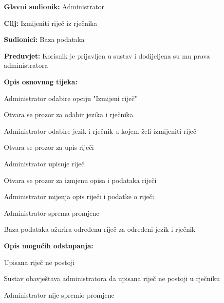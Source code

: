 					\noindent {}
					\begin{packed_item}
	
						\item \textbf{Glavni sudionik: }Administrator
						\item  \textbf{Cilj:} Izmijeniti riječ iz rječnika
						\item  \textbf{Sudionici:} Baza podataka
						\item  \textbf{Preduvjet:} Korisnik je prijavljen u sustav i dodijeljena su mu prava administratora
						\item  \textbf{Opis osnovnog tijeka:}
						
						\item[] \begin{packed_enum}
	
							\item Administrator odabire opciju "Izmijeni riječ"
							\item Otvara se prozor za odabir jezika i rječnika
							\item Administrator odabire jezik i rječnik u kojem želi izmijeniti riječ
							\item Otvara se prozor za upis riječi
							\item Administrator upisuje riječ
							\item Otvara se prozor za izmjenu opisa i podataka riječi
							\item Administrator mijenja opis riječi i podatke o riječi
							\item Administrator sprema promjene
							\item Baza podataka ažurira određenu riječ za određeni jezik i rječnik
						\end{packed_enum}

						\item  \textbf{Opis mogućih odstupanja:}
						
						\item[] \begin{packed_item}
	
							\item[5.a] Upisana riječ ne postoji
							\item[] \begin{packed_enum}
								
								\item Sustav obavještava administratora da upisana riječ ne postoji u rječniku
								
							\end{packed_enum}
							\item[8.a] Administrator nije spremio promjene
							\item[] \begin{packed_enum}
								

\end{packed_enum}
\end{packed_item}
\end{packed_item}
